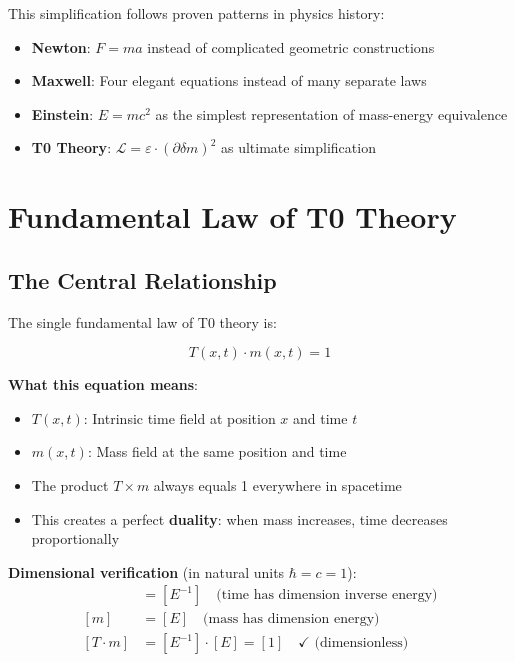 \documentclass[12pt,a4paper]{article}
\newcommand{\Tfield}{T(x,t)}
\newcommand{\mfield}{m(x,t)}
\newcommand{\deltam}{\delta m}
\newcommand{\Lag}{\mathcal{L}}
\theoremstyle{definition}
\theoremstyle{remark}
\begin{document}
	This simplification follows proven patterns in physics history:
	\begin{itemize}
		\item \textbf{Newton}: $F = ma$ instead of complicated geometric constructions
		\item \textbf{Maxwell}: Four elegant equations instead of many separate laws
		\item \textbf{Einstein}: $E = mc^2$ as the simplest representation of mass-energy equivalence
		\item \textbf{T0 Theory}: $\Lag = \varepsilon \cdot (\partial \deltam)^2$ as ultimate simplification
	\end{itemize}
	
	\section{Fundamental Law of T0 Theory}
	
	\subsection{The Central Relationship}
	
	The single fundamental law of T0 theory is:
	
	\begin{equation}
		\boxed{\Tfield \cdot \mfield = 1}
		\label{eq:fundamental_law}
	\end{equation}
	
	\textbf{What this equation means}:
	\begin{itemize}
		\item $T(x,t)$: Intrinsic time field at position $x$ and time $t$
		\item $m(x,t)$: Mass field at the same position and time
		\item The product $T \times m$ always equals 1 everywhere in spacetime
		\item This creates a perfect \textbf{duality}: when mass increases, time decreases proportionally
	\end{itemize}
	
	\textbf{Dimensional verification} (in natural units $\hbar = c = 1$):
	\begin{align}
		[T] &= [E^{-1}] \quad \text{(time has dimension inverse energy)} \\
		[m] &= [E] \quad \text{(mass has dimension energy)} \\
		[T \cdot m] &= [E^{-1}] \cdot [E] = [1] \quad \checkmark \text{ (dimensionless)}
	\end{align}
	
\end{document}

